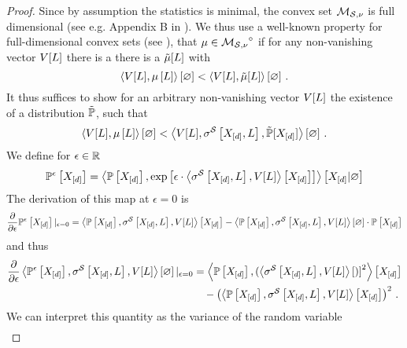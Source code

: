 \begin{proof}
    Since by assumption the statistics is minimal, the convex set $\mathcal{M}_{\mathcal{S},\nu}$ is full dimensional (see e.g. Appendix B in \cite{wainwright_graphical_2008}).
    We thus use a well-known property for full-dimensional convex sets (see \cite{rockafellar_convex_1997,hiriart-urruty_convex_1993}), that $\mu\in{\mathcal{M}_{\mathcal{S},\nu}}^{\circ}$ if for any non-vanishing vector $V[L]$ there is a  %
    there is a $\tilde{\mu}[L]$ with
    \[ \left\langle V[L],\mu\left[L\right]\right\rangle \left[ \varnothing \right] <  \left\langle V[L],\tilde{\mu}[L]\right\rangle \left[ \varnothing \right] \, . \]
    It thus suffices to show for an arbitrary non-vanishing vector $V[L]$ the existence of a distribution $\tilde{\mathbb{P}}$, such that
    \begin{align*}
        \left\langle V[L],\mu\left[L\right]\right\rangle \left[ \varnothing \right] < \left\langle V[L],\sigma^{\mathcal{S}}\left[X_{[d]},L\right],\tilde{\mathbb{P}}[X_{[d]}]\right\rangle \left[ \varnothing \right] \, .
    \end{align*}
    We define for $\epsilon\in\mathbb{R}$
    \begin{align*}
        \mathbb{P}^{\epsilon}\left[X_{[d]}\right]
        = \left\langle \mathbb{P}\left[X_{[d]}\right],\mathrm{exp}\left[\epsilon\cdot\left\langle \sigma^{\mathcal{S}}\left[X_{[d]},L\right],V[L]\right\rangle \left[ X_{[d]} \right]\right]\right\rangle \left[ X_{[d]} | \varnothing \right]
    \end{align*}
    The derivation of this map at $\epsilon=0$ is
    \begin{align*}
        \frac{\partial }{\partial \epsilon}\mathbb{P}^{\epsilon}\left[X_{[d]}\right]|_{\epsilon=0}
        = \left\langle \mathbb{P}\left[X_{[d]}\right],\sigma^{\mathcal{S}}\left[X_{[d]},L\right],V[L]\right\rangle \left[ X_{[d]} \right] - \left\langle \mathbb{P}\left[X_{[d]}\right],\sigma^{\mathcal{S}}\left[X_{[d]},L\right],V[L]\right\rangle \left[ \varnothing \right] \cdot \mathbb{P}\left[X_{[d]}\right]
    \end{align*}
    and thus
    \begin{align*}
        \frac{\partial }{\partial \epsilon} \left\langle \mathbb{P}^{\epsilon}\left[X_{[d]}\right],\sigma^{\mathcal{S}}\left[X_{[d]},L\right],V[L]\right\rangle \left[ \varnothing \right]|_{\epsilon=0}
        &= \left\langle \mathbb{P}\left[X_{[d]}\right],(\left\langle \sigma^{\mathcal{S}}\left[X_{[d]},L\right],V[L]\right\rangle \left[ ) \right]^2\right\rangle \left[ X_{[d]} \right] \\
        & \quad - \left(\left\langle \mathbb{P}\left[X_{[d]}\right],\sigma^{\mathcal{S}}\left[X_{[d]},L\right],V[L]\right\rangle \left[ X_{[d]} \right]\right)^2 \, .
    \end{align*}
    We can interpret this quantity as the variance of the random variable
    \begin{align*}

\end{align*}
\end{proof}
